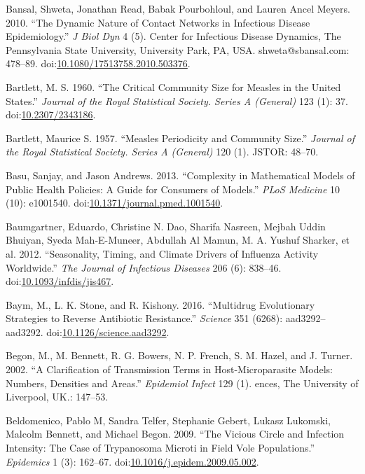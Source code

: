 \documentclass[]{book}
\theoremstyle{definition}
\theoremstyle{definition}
\theoremstyle{definition}
\theoremstyle{remark}
\begin{document}
\hypertarget{ref-bansal10}{}
Bansal, Shweta, Jonathan Read, Babak Pourbohloul, and Lauren Ancel
Meyers. 2010. ``The Dynamic Nature of Contact Networks in Infectious
Disease Epidemiology.'' \emph{J Biol Dyn} 4 (5). Center for Infectious
Disease Dynamics, The Pennsylvania State University, University Park,
PA, USA. shweta@sbansal.com: 478--89.
doi:\href{https://doi.org/10.1080/17513758.2010.503376}{10.1080/17513758.2010.503376}.

\hypertarget{ref-bartlett60}{}
Bartlett, M. S. 1960. ``The Critical Community Size for Measles in the
United States.'' \emph{Journal of the Royal Statistical Society. Series
A (General)} 123 (1): 37.
doi:\href{https://doi.org/10.2307/2343186}{10.2307/2343186}.

\hypertarget{ref-bartlett57}{}
Bartlett, Maurice S. 1957. ``Measles Periodicity and Community Size.''
\emph{Journal of the Royal Statistical Society. Series A (General)} 120
(1). JSTOR: 48--70.

\hypertarget{ref-basu13}{}
Basu, Sanjay, and Jason Andrews. 2013. ``Complexity in Mathematical
Models of Public Health Policies: A Guide for Consumers of Models.''
\emph{PLoS Medicine} 10 (10): e1001540.
doi:\href{https://doi.org/10.1371/journal.pmed.1001540}{10.1371/journal.pmed.1001540}.

\hypertarget{ref-baumgartner12}{}
Baumgartner, Eduardo, Christine N. Dao, Sharifa Nasreen, Mejbah Uddin
Bhuiyan, Syeda Mah-E-Muneer, Abdullah Al Mamun, M. A. Yushuf Sharker, et
al. 2012. ``Seasonality, Timing, and Climate Drivers of Influenza
Activity Worldwide.'' \emph{The Journal of Infectious Diseases} 206 (6):
838--46.
doi:\href{https://doi.org/10.1093/infdis/jis467}{10.1093/infdis/jis467}.

\hypertarget{ref-baym16}{}
Baym, M., L. K. Stone, and R. Kishony. 2016. ``Multidrug Evolutionary
Strategies to Reverse Antibiotic Resistance.'' \emph{Science} 351
(6268): aad3292--aad3292.
doi:\href{https://doi.org/10.1126/science.aad3292}{10.1126/science.aad3292}.

\hypertarget{ref-begon02}{}
Begon, M., M. Bennett, R. G. Bowers, N. P. French, S. M. Hazel, and J.
Turner. 2002. ``A Clarification of Transmission Terms in
Host-Microparasite Models: Numbers, Densities and Areas.''
\emph{Epidemiol Infect} 129 (1). ences, The University of Liverpool,
UK.: 147--53.

\hypertarget{ref-beldomenico09}{}
Beldomenico, Pablo M, Sandra Telfer, Stephanie Gebert, Lukasz Lukomski,
Malcolm Bennett, and Michael Begon. 2009. ``The Vicious Circle and
Infection Intensity: The Case of Trypanosoma Microti in Field Vole
Populations.'' \emph{Epidemics} 1 (3): 162--67.
doi:\href{https://doi.org/10.1016/j.epidem.2009.05.002}{10.1016/j.epidem.2009.05.002}.
\end{document}

